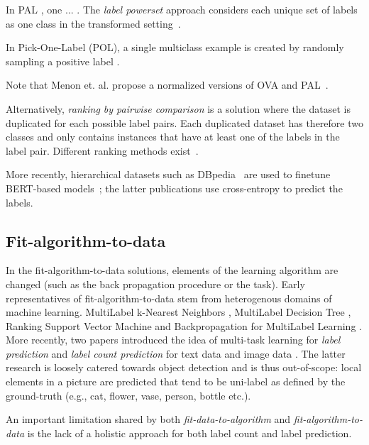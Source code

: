 In PAL , one ... \citep{labelPowerset, extremeClassification, PAL}. The \textit{label powerset} approach considers each unique set of labels as one class in the transformed setting~\cite{labelPowerset}.

In Pick-One-Label (POL), a single multiclass example is created by randomly sampling a positive label \cite{PAL, extremeClassification}.

Note that Menon et. al. propose a normalized versions of OVA and PAL~\cite{multilabelReduction}.

Alternatively, \textit{ranking by pairwise comparison} is a solution where the dataset is duplicated for each possible label pairs. Each duplicated dataset has therefore two classes and only contains instances that have at least one of the labels in the label pair. Different ranking methods exist~\cite{pairwiseBinary, pairwiseNet}.

More recently, hierarchical datasets such as DBpedia~\citep{lehmann2015dbpedia} are used to finetune BERT-based models~\cite{XLNet, bigBird};  the latter publications use cross-entropy to predict the labels.

\subsection{Fit-algorithm-to-data}
In the fit-algorithm-to-data solutions, elements of the learning
algorithm are changed (such as the back propagation procedure or the task).
Early representatives of fit-algorithm-to-data stem from heterogenous domains
of machine learning. MultiLabel k-Nearest Neighbors \cite{ML-KNN},
MultiLabel Decision Tree \cite{ML-DT}, Ranking Support Vector Machine
\cite{multilabelSVM} and Backpropagation for MultiLabel Learning
\cite{multilabelBackprop}. More recently, two papers introduced the idea of
multi-task learning for \emph{label prediction} and \emph{label count
prediction} for text data \cite[ML\(_{\text{NET}}\)][]{multitaskLabel} and image
data \cite{multitaskLabelImages, tencent}. The latter research is loosely
catered towards object detection and is thus out-of-scope: local elements in a picture are predicted that tend to be uni-label as defined by the ground-truth (e.g., cat, flower, vase, person, bottle
etc.).

An important limitation shared by both \emph{fit-data-to-algorithm} and \emph{fit-algorithm-to-data} is the lack of a holistic approach for both label count and label prediction.

